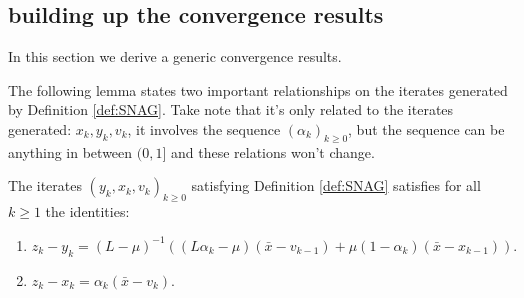 \documentclass[12pt]{article}
\begin{document}
    \begin{lemma}\label{lemma:seq-properties}
            
    \end{lemma}
    \subsection{building up the convergence results}
        In this section we derive a generic convergence results. 
        \par
        The following lemma states two important relationships on the iterates generated by Definition \ref{def:SNAG}. 
        Take note that it's only related to the iterates generated: $x_k, y_k, v_k$, it involves the sequence $(\alpha_k)_{k \ge 0}$, but the sequence can be anything in between $(0, 1]$ and these relations won't change. 
        \begin{lemma}\label{lemma:snag-identities}
            The iterates $(y_k, x_k, v_k)_{k \ge0}$ satisfying Definition \ref{def:SNAG} satisfies for all $k \ge 1$ the identities: 
            \begin{enumerate}[nosep]
                \item $z_k - y_k = (L - \mu)^{-1}((L\alpha_k - \mu)(\bar x - v_{k - 1}) + \mu(1 - \alpha_k)(\bar x - x_{k - 1})).$
                \item $z_k - x_k = \alpha_k (\bar x - v_k).$
            \end{enumerate}
        \end{lemma}
\end{document}
